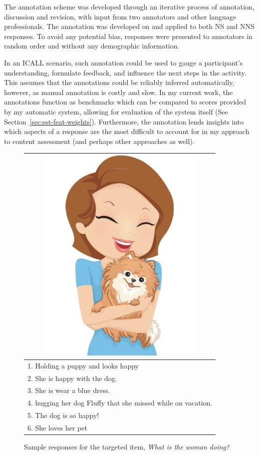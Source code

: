 The annotation scheme was developed through an iterative process of annotation, discussion and revision, with input from two annotators and other language professionals. The annotation was developed on and applied to both NS and NNS responses. To avoid any potential bias, responses were presented to annotators in random order and without any demographic information.

In an ICALL scenario, such annotation could be used to gauge a participant's understanding, formulate feedback, and influence the next steps in the activity. This assumes that the annotations could be reliably inferred automatically, however, as manual annotation is costly and slow. In my current work, the annotations function as benchmarks which can be compared to scores provided by my automatic system, allowing for evaluation of the system itself (See Section~\ref{sec:est-feat-weights}). Furthermore, the annotation lends insights into which aspects of a response are the most difficult to account for in my approach to content assessment (and perhaps other approaches as well).

\begin{figure}[htb!]
\begin{center}
\begin{tabular}{|l|}
\hline
\multicolumn{1}{|c|}{\includegraphics[width=0.45\columnwidth]{figures/I29.jpg}} \\
\hline
1. Holding a puppy and looks happy \\
\hline
2. She is happy with the dog. \\
\hline
3. She is wear a blue dress. \\
\hline
4. hugging her dog Fluffy that she missed while on vacation. \\
\hline
5. The dog is so happy! \\
\hline
6. She loves her pet \\
\hline
\end{tabular}
\caption{\label{fig:sample-responses} Sample responses for the targeted item, \textit{What is the woman doing?}}
\end{center}
\end{figure}

